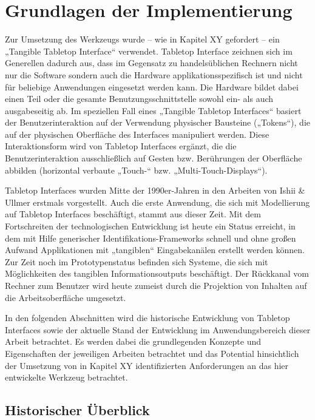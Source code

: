 
\chapter{Grundlagen der Implementierung} %
\label{cha:implementierung_Überblick}

Zur Umsetzung des Werkzeugs wurde -- wie in Kapitel XY gefordert -- ein „Tangible Tabletop Interface“ verwendet. Tabletop Interface zeichnen sich im Generellen dadurch aus, dass im Gegensatz zu handelsüblichen Rechnern nicht nur die Software sondern auch die Hardware applikationsspezifisch ist und nicht für beliebige Anwendungen eingesetzt werden kann. Die Hardware bildet dabei einen Teil oder die gesamte Benutzungsschnittstelle sowohl ein- als auch ausgabeseitig ab. Im speziellen Fall eines „Tangible Tabletop Interfaces“ basiert der Benutzerinteraktion auf der Verwendung physischer Bausteine („Tokens“), die auf der physischen Oberfläche des Interfaces manipuliert werden. Diese Interaktionsform wird von Tabletop Interfaces ergänzt, die die Benutzerinteraktion ausschließlich auf Gesten bzw. Berührungen der Oberfläche abbilden (horizontal verbaute „Touch-“ bzw. „Multi-Touch-Displays“).

Tabletop Interfaces wurden Mitte der 1990er-Jahren in den Arbeiten von Ishii \& Ullmer erstmals vorgestellt. Auch die erste Anwendung, die sich mit Modellierung auf Tabletop Interfaces beschäftigt, stammt aus dieser Zeit. Mit dem Fortschreiten der technologischen Entwicklung ist heute ein Status erreicht, in dem mit Hilfe generischer Identifikations-Frameworks schnell und ohne großen Aufwand Applikationen mit „tangiblen“ Eingabekanälen erstellt werden können. Zur Zeit noch im Prototypenstatus befinden sich Systeme, die sich mit Möglichkeiten des tangiblen Informationsoutputs beschäftigt. Der Rückkanal vom Rechner zum Benutzer wird heute zumeist durch die Projektion von Inhalten auf die Arbeitsoberfläche umgesetzt.

In den folgenden Abschnitten wird die historische Entwicklung von Tabletop Interfaces sowie der aktuelle Stand der Entwicklung im Anwendungsbereich dieser Arbeit betrachtet. Es werden dabei die grundlegenden Konzepte und Eigenschaften der jeweiligen Arbeiten betrachtet und das Potential hinsichtlich der Umsetzung von in Kapitel XY identifizierten Anforderungen an das hier entwickelte Werkzeug betrachtet. 

\section{Historischer Überblick} %
\label{sec:entwicklung_tangible_interfaces}

